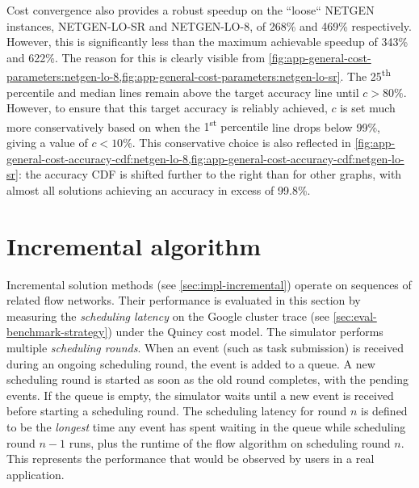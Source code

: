 Cost convergence also provides a robust speedup on the ``loose`` NETGEN instances, NETGEN-LO-SR and NETGEN-LO-8, of 268\% and 469\% respectively. However, this is significantly less than the maximum achievable speedup of 343\% and 622\%. The reason for this is clearly visible from \cref{fig:app-general-cost-parameters:netgen-lo-8,fig:app-general-cost-parameters:netgen-lo-sr}. The 25\textsuperscript{th} percentile and {\color{matplotlib_cyan} median} lines remain above the target accuracy line until $c > 80\%$. However, to ensure that this target accuracy is reliably achieved, $c$ is set much more conservatively based on when the {\color{matplotlib_blue} 1\textsuperscript{st} percentile} line drops below 99\%, giving a value of $c < 10\%$. This conservative choice is also reflected in \cref{fig:app-general-cost-accuracy-cdf:netgen-lo-8,fig:app-general-cost-accuracy-cdf:netgen-lo-sr}: the accuracy CDF is shifted further to the right than for other graphs, with almost all solutions achieving an accuracy in excess of 99.8\%.

\section{Incremental algorithm} \label{sec:eval-incremental}

Incremental solution methods (see \cref{sec:impl-incremental}) operate on sequences of related flow networks. Their performance is evaluated in this section by measuring the \emph{scheduling latency} on the Google cluster trace (see \cref{sec:eval-benchmark-strategy}) under the Quincy cost model. The simulator performs multiple \emph{scheduling rounds}. When an event (such as task submission) is received during an ongoing scheduling round, the event is added to a queue. A new scheduling round is started as soon as the old round completes, with the pending events. If the queue is empty, the simulator waits until a new event is received before starting a scheduling round. The scheduling latency for round $n$ is defined to be the \emph{longest} time any event has spent waiting in the queue while scheduling round $n-1$ runs, plus the runtime of the flow algorithm on scheduling round $n$. This represents the performance that would be observed by users in a real application.


